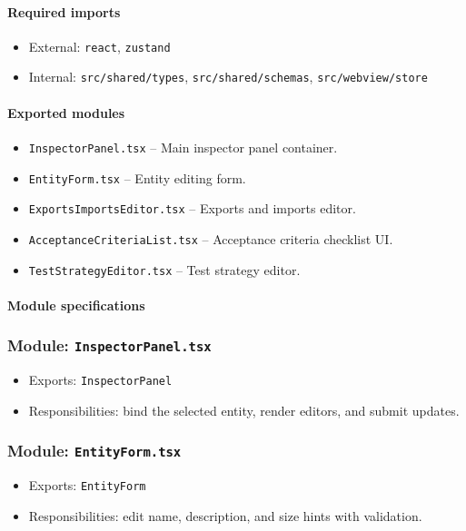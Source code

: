 \documentclass[11pt]{article}
\begin{document}
\paragraph{Required imports}
\begin{itemize}[noitemsep]
  \item External: \texttt{react}, \texttt{zustand}
  \item Internal: \texttt{src/shared/types}, \texttt{src/shared/schemas}, \texttt{src/webview/store}
\end{itemize}

\paragraph{Exported modules}
\begin{itemize}[noitemsep]
  \item \texttt{InspectorPanel.tsx} -- Main inspector panel container.
  \item \texttt{EntityForm.tsx} -- Entity editing form.
  \item \texttt{ExportsImportsEditor.tsx} -- Exports and imports editor.
  \item \texttt{AcceptanceCriteriaList.tsx} -- Acceptance criteria checklist UI.
  \item \texttt{TestStrategyEditor.tsx} -- Test strategy editor.
\end{itemize}

\paragraph{Module specifications}
\subsubsection*{Module: \texttt{InspectorPanel.tsx}}
\begin{itemize}[noitemsep]
  \item Exports: \texttt{InspectorPanel}
  \item Responsibilities: bind the selected entity, render editors, and submit updates.
\end{itemize}

\subsubsection*{Module: \texttt{EntityForm.tsx}}
\begin{itemize}[noitemsep]
  \item Exports: \texttt{EntityForm}
  \item Responsibilities: edit name, description, and size hints with validation.
\end{itemize}
\end{document}
